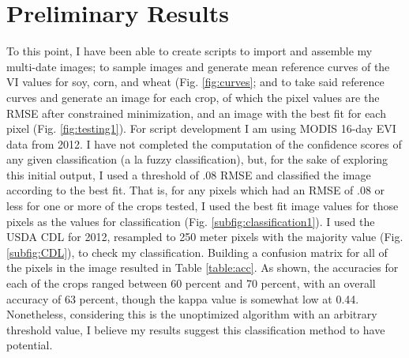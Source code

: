 \section*{Preliminary Results}
\label{sec:prelim}

To this point, I have been able to create scripts to import and assemble my multi-date images; to sample images and generate mean reference curves of the VI values for soy, corn, and wheat (Fig. \ref{fig:curves}; and to take said reference curves and generate an image for each crop, of which the pixel values are the RMSE after constrained minimization, and an image with the best fit for each pixel (Fig. \ref{fig:testing1}). For script development I am using MODIS 16-day EVI data from 2012. I have not completed the computation of the confidence scores of any given classification (a la fuzzy classification), but, for the sake of exploring this initial output, I used a threshold of .08 RMSE and classified the image according to the best fit. That is, for any pixels which had an RMSE of .08 or less for one or more of the crops tested, I used the best fit image values for those pixels as the values for classification (Fig. \ref{subfig:classification1}). I used the USDA CDL for 2012, resampled to 250 meter pixels with the majority value (Fig. \ref{subfig:CDL}), to check my classification. Building a confusion matrix for all of the pixels in the image resulted in Table \ref{table:acc}. As shown, the accuracies for each of the crops ranged between 60 percent and 70 percent, with an overall accuracy of 63 percent, though the kappa value is somewhat low at 0.44. Nonetheless, considering this is the unoptimized algorithm with an arbitrary threshold value, I believe my results suggest this classification method to have potential.

